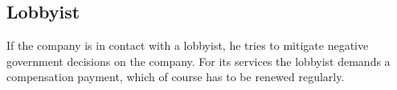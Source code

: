 \subsection{Lobbyist}
If the company is in contact with a lobbyist, he tries to mitigate negative government decisions on the company. For its services the lobbyist demands a compensation payment, which of course has to be renewed regularly.


